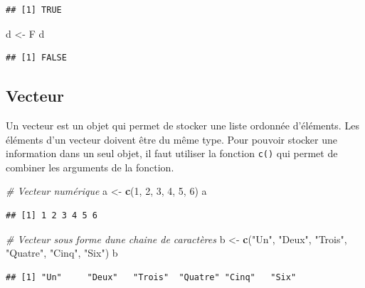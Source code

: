 \documentclass[
]{book}
\newenvironment{Shaded}{\begin{snugshade}}{\end{snugshade}}
\newcommand{\CommentTok}[1]{\textcolor[rgb]{0.56,0.35,0.01}{\textit{#1}}}
\newcommand{\DecValTok}[1]{\textcolor[rgb]{0.00,0.00,0.81}{#1}}
\newcommand{\FunctionTok}[1]{\textcolor[rgb]{0.13,0.29,0.53}{\textbf{#1}}}
\newcommand{\NormalTok}[1]{#1}
\newcommand{\OtherTok}[1]{\textcolor[rgb]{0.56,0.35,0.01}{#1}}
\newcommand{\StringTok}[1]{\textcolor[rgb]{0.31,0.60,0.02}{#1}}
\begin{document}
\begin{verbatim}
## [1] TRUE
\end{verbatim}

\begin{Shaded}
\begin{Highlighting}[]
\NormalTok{d }\OtherTok{\textless{}{-}}\NormalTok{ F}
\NormalTok{d  }
\end{Highlighting}
\end{Shaded}

\begin{verbatim}
## [1] FALSE
\end{verbatim}

\subsection{Vecteur}\label{vecteur}

Un vecteur est un objet qui permet de stocker une liste ordonnée d'éléments. Les éléments d'un vecteur doivent être du même type.
Pour pouvoir stocker une information dans un seul objet, il faut utiliser la fonction \texttt{c()} qui permet de combiner les arguments de la fonction.

\begin{Shaded}
\begin{Highlighting}[]
\CommentTok{\# Vecteur numérique}
\NormalTok{a }\OtherTok{\textless{}{-}} \FunctionTok{c}\NormalTok{(}\DecValTok{1}\NormalTok{, }\DecValTok{2}\NormalTok{, }\DecValTok{3}\NormalTok{, }\DecValTok{4}\NormalTok{, }\DecValTok{5}\NormalTok{, }\DecValTok{6}\NormalTok{)}
\NormalTok{a}
\end{Highlighting}
\end{Shaded}

\begin{verbatim}
## [1] 1 2 3 4 5 6
\end{verbatim}

\begin{Shaded}
\begin{Highlighting}[]
\CommentTok{\# Vecteur sous forme d\textquotesingle{}une chaine de caractères}
\NormalTok{b }\OtherTok{\textless{}{-}} \FunctionTok{c}\NormalTok{(}\StringTok{"Un"}\NormalTok{, }\StringTok{"Deux"}\NormalTok{, }\StringTok{"Trois"}\NormalTok{, }\StringTok{"Quatre"}\NormalTok{, }\StringTok{"Cinq"}\NormalTok{, }\StringTok{"Six"}\NormalTok{)}
\NormalTok{b}
\end{Highlighting}
\end{Shaded}

\begin{verbatim}
## [1] "Un"     "Deux"   "Trois"  "Quatre" "Cinq"   "Six"
\end{verbatim}
\end{document}

